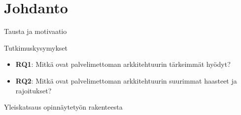 \chapter{Johdanto} \label{Johdanto}

Tausta ja motivaatio

Tutkimuskysymykset

\begin{itemize}
  \item  \textbf{RQ1}: Mitkä ovat palvelimettoman arkkitehtuurin tärkeimmät hyödyt?
  \item  \textbf{RQ2}: Mitkä ovat palvelimettoman arkkitehtuurin suurimmat haasteet ja rajoitukset?
\end{itemize}



Yleiskatsaus opinnäytetyön rakenteesta


